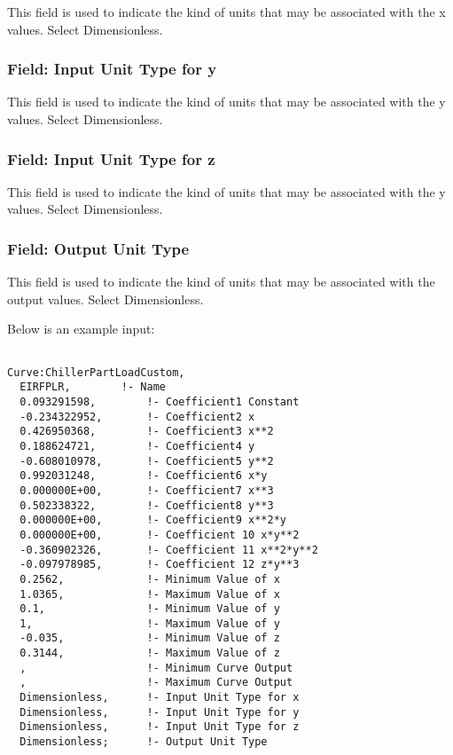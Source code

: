 This field is used to indicate the kind of units that may be associated with the x values. Select Dimensionless.

\subsubsection{Field: Input Unit Type for y}\label{field-input-unit-type-for-y-4}

This field is used to indicate the kind of units that may be associated with the y values. Select Dimensionless.

\subsubsection{Field: Input Unit Type for z}\label{field-input-unit-type-for-z-1}

This field is used to indicate the kind of units that may be associated with the y values. Select Dimensionless.

\subsubsection{Field: Output Unit Type}\label{field-output-unit-type-8}

This field is used to indicate the kind of units that may be associated with the output values. Select Dimensionless.

Below is an example input:

\begin{lstlisting}

Curve:ChillerPartLoadCustom,
  EIRFPLR,        !- Name  
  0.093291598,        !- Coefficient1 Constant
  -0.234322952,       !- Coefficient2 x
  0.426950368,        !- Coefficient3 x**2
  0.188624721,        !- Coefficient4 y
  -0.608010978,       !- Coefficient5 y**2
  0.992031248,        !- Coefficient6 x*y
  0.000000E+00,       !- Coefficient7 x**3
  0.502338322,        !- Coefficient8 y**3
  0.000000E+00,       !- Coefficient9 x**2*y
  0.000000E+00,       !- Coefficient 10 x*y**2
  -0.360902326,       !- Coefficient 11 x**2*y**2
  -0.097978985,       !- Coefficient 12 z*y**3 
  0.2562,             !- Minimum Value of x
  1.0365,             !- Maximum Value of x
  0.1,                !- Minimum Value of y
  1,                  !- Maximum Value of y
  -0.035,             !- Minimum Value of z
  0.3144,             !- Maximum Value of z
  ,                   !- Minimum Curve Output
  ,                   !- Maximum Curve Output
  Dimensionless,      !- Input Unit Type for x
  Dimensionless,      !- Input Unit Type for y
  Dimensionless,      !- Input Unit Type for z
  Dimensionless;      !- Output Unit Type
\end{lstlisting}

